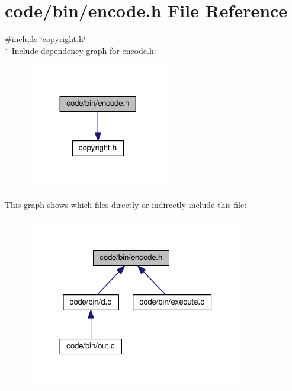 \section{code/bin/encode.h File Reference}
\label{encode_8h}
{\ttfamily \#include \char`\"{}copyright.\+h\char`\"{}}\\*
Include dependency graph for encode.\+h\+:
\nopagebreak
\begin{figure}[H]
\begin{center}
\leavevmode
\includegraphics[width=176pt]{encode_8h__incl}
\end{center}
\end{figure}
This graph shows which files directly or indirectly include this file\+:
\nopagebreak
\begin{figure}[H]
\begin{center}
\leavevmode
\includegraphics[width=272pt]{encode_8h__dep__incl}
\end{center}
\end{figure}
